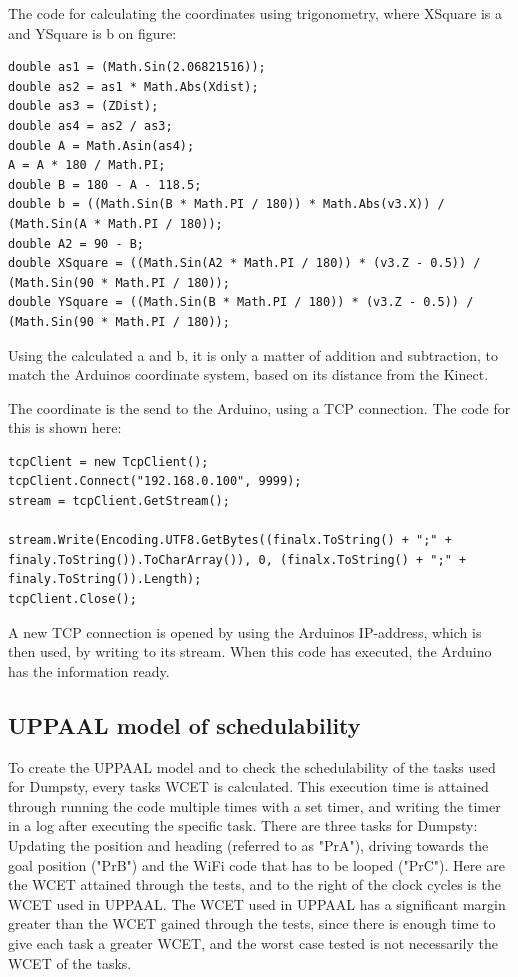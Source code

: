 The code for calculating the coordinates using trigonometry, where XSquare is a and YSquare is b on figure:

\begin{lstlisting}[caption={Converting coordinates form Kinect}, label={convertCoordinate}]
double as1 = (Math.Sin(2.06821516));
double as2 = as1 * Math.Abs(Xdist);
double as3 = (ZDist);
double as4 = as2 / as3;
double A = Math.Asin(as4);
A = A * 180 / Math.PI;
double B = 180 - A - 118.5;
double b = ((Math.Sin(B * Math.PI / 180)) * Math.Abs(v3.X)) / (Math.Sin(A * Math.PI / 180));
double A2 = 90 - B;
double XSquare = ((Math.Sin(A2 * Math.PI / 180)) * (v3.Z - 0.5)) / (Math.Sin(90 * Math.PI / 180));
double YSquare = ((Math.Sin(B * Math.PI / 180)) * (v3.Z - 0.5)) / (Math.Sin(90 * Math.PI / 180));
\end{lstlisting}

Using the calculated a and b, it is only a matter of addition and subtraction, to match the Arduinos coordinate system, based on its distance from the Kinect.

The coordinate is the send to the Arduino, using a TCP connection.
The code for this is shown here:
\begin{lstlisting}[caption={Sending data to the Arduino}, label={sendData}]
tcpClient = new TcpClient();
tcpClient.Connect("192.168.0.100", 9999);
stream = tcpClient.GetStream();

stream.Write(Encoding.UTF8.GetBytes((finalx.ToString() + ";" + finaly.ToString()).ToCharArray()), 0, (finalx.ToString() + ";" + finaly.ToString()).Length);
tcpClient.Close();
\end{lstlisting}

A new TCP connection is opened by using the Arduinos IP-address, which is then used, by writing to its stream.
When this code has executed, the Arduino has the information ready.

\subsection{UPPAAL model of schedulability}
\label{sec:i3UPPAAL model}
To create the UPPAAL model and to check the schedulability of the tasks used for Dumpsty, every tasks WCET is calculated. This execution time is attained through running the code multiple times with a set timer, and writing the timer in a log after executing the specific task. There are three tasks for Dumpsty: Updating the position and heading (referred to as "PrA"), driving towards the goal position ("PrB") and the WiFi code that has to be looped ("PrC"). Here are the WCET attained through the tests, and to the right of the clock cycles is the WCET used in UPPAAL. The WCET used in UPPAAL has a significant margin greater than the WCET gained through the tests, since there is enough time to give each task a greater WCET, and the worst case tested is not necessarily the WCET of the tasks. 

